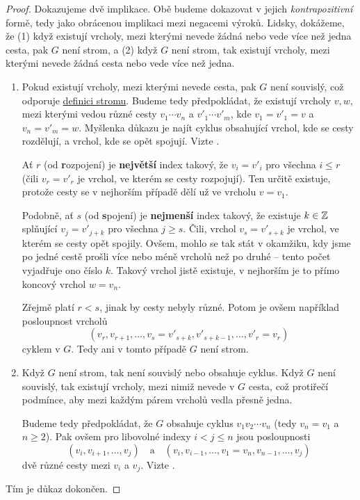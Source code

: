 \begin{proof}
 Dokazujeme dvě implikace. Obě budeme dokazovat v jejich \emph{kontrapozitivní}
 formě, tedy jako obrácenou implikaci mezi negacemi výroků. Lidsky, dokážeme, že
 (1) když existují vrcholy, mezi kterými nevede žádná nebo vede více než jedna
 cesta, pak $G$ není strom, a (2) když $G$ není strom, tak existují vrcholy,
 mezi kterými nevede žádná cesta nebo vede více než jedna.
 \begin{enumerate}
  \item Pokud existují vrcholy, mezi kterými nevede cesta, pak $G$ není
   souvislý, což odporuje \hyperref[def:strom]{definici stromu}. Budeme tedy
   předpokládat, že existují vrcholy $v,w$, mezi kterými vedou různé cesty $v_1
   \cdots v_n$ a $v'_1 \cdots v'_m$, kde $v_1 = v'_1 = v$ a $v_n = v'_m = w$.
   Myšlenka důkazu je najít cyklus obsahující vrchol, kde se cesty rozdělují, a
   vrchol, kde se opět spojují. Vizte
   .

   Ať $r$ (od \textbf{r}ozpojení) je \textbf{největší} index takový, že $v_i =
   v'_i$ pro všechna $i \leq r$ (čili $v_r = v'_r$ je vrchol, ve kterém se cesty
   rozpojují). Ten určitě existuje, protože cesty se v nejhorším případě dělí už
   ve vrcholu $v = v_1$.

   Podobně, ať $s$ (od \textbf{s}pojení) je \textbf{nejmenší} index takový, že
   existuje $k \in \mathbb{Z}$ splňující $v_j = v'_{j+k}$ pro všechna $j \geq s$. Čili,
   vrchol $v_s = v'_{s+k}$ je vrchol, ve kterém se cesty opět spojily. Ovšem,
   mohlo se tak stát v okamžiku, kdy jsme po jedné cestě prošli více nebo méně
   vrcholů než po druhé -- tento počet vyjadřuje ono číslo $k$. Takový vrchol
   jistě existuje, v nejhorším je to přímo koncový vrchol $w = v_n$.

   Zřejmě platí $r < s$, jinak by cesty nebyly různé. Potom je ovšem například
   posloupnost vrcholů
   \[
    (v_r,v_{r+1},\ldots,v_s = v'_{s+k},v'_{s+k-1},\ldots,v'_r = v_r)
   \]
   cyklem v $G$. Tedy ani v tomto případě $G$ není strom.
  \item Když $G$ není strom, tak není souvislý nebo obsahuje cyklus. Když $G$
   není souvislý, tak existují vrcholy, mezi nimiž nevede v $G$ cesta, což
   protiřečí podmínce, aby mezi každým párem vrcholů vedla přesně jedna.

   Budeme tedy předpokládat, že $G$ obsahuje cyklus $v_1v_2 \cdots v_n$ (tedy
   $v_n = v_1$ a $n \geq 2$). Pak ovšem pro libovolné indexy $i < j \leq n$ jsou
   posloupnosti
   \[
    (v_i,v_{i+1},\ldots,v_j) \quad \text{a} \quad (v_i,v_{i-1},\ldots,v_1 =
    v_n,v_{n-1},\ldots,v_j)
   \]
   dvě různé cesty mezi $v_i$ a $v_j$. Vizte
   .
 \end{enumerate}
 Tím je důkaz dokončen.
\end{proof}

